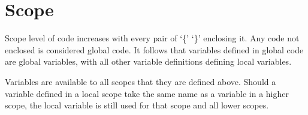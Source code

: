 \documentclass{standalone}
\begin{document}
		

	\section{Scope}
		Scope level of code increases with every pair of `\{' `\}' enclosing it. Any code not enclosed is considered global code. It follows that variables defined in global code are global variables, with all other variable definitions defining local variables.

		Variables are available to all scopes that they are defined above. Should a variable defined in a local scope take the same name as a variable in a higher scope, the local variable is still used for that scope and all lower scopes.
\end{document}
